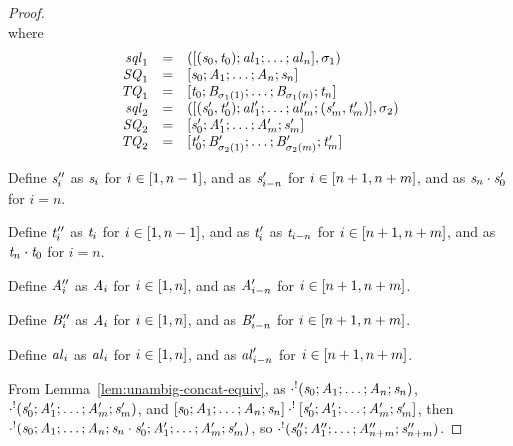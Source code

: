 \documentclass[numbers]{sigplanconf}
\begin{document}
\begin{proof}
\[{    }
  \]
  where
  \[
    \begin{array}{rcl}
      \mathit{sql}_1 & = &
                            ([(\mathit{s}_0,\mathit{t}_0);\mathit{al}_1;\ldots;\mathit{al}_n],
                            \sigma_1)\\
      \mathit{SQ}_1 & = &
                        [\mathit{s}_0;\mathit{A}_1;\ldots;\mathit{A}_n;\mathit{s}_n]\\
      \mathit{TQ}_1 & = &
                           [\mathit{t}_0;\mathit{B}_{\sigma_1(1)};\ldots;\mathit{B}_{\sigma_1(n)};\mathit{t}_n]\\
      \mathit{sql}_2 & = &
                            ([(\mathit{s}_0',\mathit{t}_0');\mathit{al}_1';\ldots;\mathit{al}_m';(\mathit{s}_m',\mathit{t}_m')],\sigma_2)\\
      \mathit{SQ}_2 & = &
                        [\mathit{s}_0';\mathit{A}_1';\ldots;\mathit{A}_m';\mathit{s}_m']\\
      \mathit{TQ}_2 & = &
                           [\mathit{t}_0';\mathit{B}_{\sigma_2(1)}';\ldots;\mathit{B}_{\sigma_2(m)}';\mathit{t}_m']
    \end{array}
  \]

  Define $\mathit{s}_i''$ as $\mathit{s}_i$ for $i \in [1,n-1]$, and as
  $\mathit{s}_{i-n}'$ for $i \in [n+1,n+m]$, and as
  $\mathit{s}_n\cdot\mathit{s}_0'$ for $i=n$.

  Define $\mathit{t}_i''$ as $\mathit{t}_i$ for $i \in [1,n-1]$,
  and as $\mathit{t}_i'$ as $\mathit{t}_{i-n}$ for $i \in
  [n+1,n+m]$, and as $\mathit{t}_n\cdot\mathit{t}_0$ for $i=n$.

  Define $\mathit{A}_i''$ as $\mathit{A}_i$ for $i \in [1,n]$, and as
  $\mathit{A}_{i-n}'$ for $i \in [n+1,n+m]$.

  Define $\mathit{B}_i''$ as $\mathit{A}_i$ for $i \in [1,n]$, and as
  $\mathit{B}_{i-n}'$ for $i \in [n+1,n+m]$.

  Define $\mathit{al}_i$ as $\mathit{al}_i$ for $i \in [1,n]$, and as
  $\mathit{al}_{i-n}'$ for $i \in [n+1,n+m]$.

  From Lemma~\ref{lem:unambig-concat-equiv}, as
  $\cdot^!(\mathit{s}_0;\mathit{A}_1;\ldots;\mathit{A}_n;\mathit{s}_n)$,
  $\cdot^!(\mathit{s}_0';\mathit{A}_1';\ldots;\mathit{A}_m';\mathit{s}_m')$,
  and
  $[\mathit{s}_0;\mathit{A}_1;\ldots;\mathit{A}_n;\mathit{s}_n] \cdot^! [\mathit{s}_0';\mathit{A}_1';\ldots;\mathit{A}_m';\mathit{s}_m']$,
  then $\cdot^!(\mathit{s}_0;\mathit{A}_1;\ldots;\mathit{A}_n;
    \mathit{s}_n\cdot\mathit{s}_0';
    \mathit{A}_1';\ldots;\mathit{A}_m';\mathit{s}_m')$, so
  $\cdot^!(\mathit{s}_0'';\mathit{A}_1'';\ldots;\mathit{A}_{n+m}'';\mathit{s}_{n+m}'')$.


\end{proof}
\end{document}
